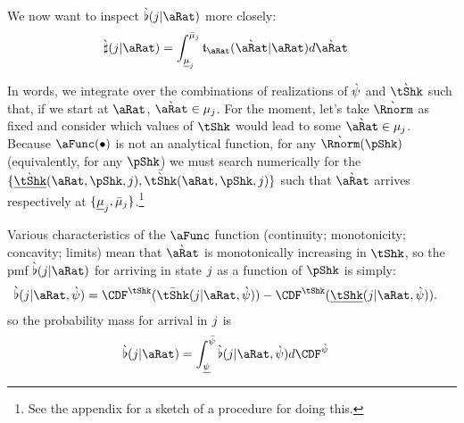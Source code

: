 \documentclass[\econtexRoot/BufferStockTheory.tex]{subfiles}
\begin{document}
\begin{comment}
  Equation \eqref{eq:stateDensity} translates to
  \begin{align}
    \DnsPnt_{\tAbs+1}(\Nxt{\pnt}) &= \int_{\SetFullCnts} \DnsPntNxtFmPntNow_{\pnt}(\Nxt{\pnt}|\pnt)\DnsPnt_{\tAbs}(\pnt)d\pnt ~~~~ \forall~\Nxt{\pnt} \in \SetFullCnts \label{eq:stateDensity}
  \end{align}
\end{comment}

We now want to inspect $\Nxt{\PrbBinNxtFmPntNow}(\thatBin|\pnt)$ more closely:
\begin{align}
  \Nxt{\PrbBinNxtFmPntNowAprx}(\thatBin|\pnt) &=   \int_{\Bot{\SetPartCnts}_{\thatBin}}^{\Top{\SetPartCnts}_{\thatBin}}\DnsPntNxtFmPntNow_{\pnt}(\Nxt{\pnt}|\pnt) d\Nxt{\pnt}
\end{align}

In words, we integrate over the combinations of realizations of $\grave{\psi}$ and $\Nxt{\tShk}$ such that, if we start at $\pnt$, $\Nxt{\pnt} \in \SetPartCnts_{j}$.  For the moment, let's take $\Nxt{\Rnorm}$ as fixed and consider which values of $\tShk$ would lead to some $\Nxt{\pnt} \in \SetPartCnts_{\thatBin}$. Because $\aFunc(\bullet)$ is not an analytical function, for any $\Nxt{\Rnorm}(\pShk)$ (equivalently, for any $\pShk$) we must search numerically for the $\{\Bot{\Nxt{\tShk}}(\pnt,\pShk,\thatBin),\Top{\Nxt{\tShk}}(\pnt,\pShk,\thatBin)\}$ such that $\Nxt{\pnt}$ arrives respectively at $\{\underline{\mu}_{j},\bar{\mu}_{j}\}$.\footnote{See the appendix for a sketch of a procedure for doing this.}


Various characteristics of the $\aFunc$ function (continuity; monotonicity; concavity; limits) mean that $\Nxt{\pnt}$ is monotonically increasing in $\tShk$, so the {pmf} $\Nxt{\PrbBinNxtFmPntNow}(\thatBin|\pnt)$  for arriving in state $j$ as a function of $\pShk$ is simply:
\begin{align}
  \Nxt{\PrbBinNxtFmPntNow}(\thatBin|\pnt,\Nxt{\DnsShk}) & = \CDF^{\tShk}(\Top{\tShk}(\thatBin|\pnt,\Nxt{\DnsShk}))-\CDF^{\tShk}(\Bot{\tShk}(\thatBin|\pnt,\Nxt{\DnsShk})).
\end{align}
so the probability mass for arrival in $j$ is
\begin{align}
  \Nxt{\PrbBinNxtFmPntNow}(\thatBin | \pnt) & = \int_{\Bot{\DnsShk}}^{\Top{\DnsShk}} \Nxt{\PrbBinNxtFmPntNow}(\thatBin|\pnt,\Nxt{\DnsShk}) d\CDF^{\Nxt{\DnsShk}}
\end{align}
\end{document}

